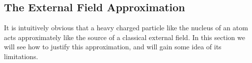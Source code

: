 
\subsection[The External Field Approximation]{The External Field Approximation\texorpdfstring{\protect\footnotemark}{}}

It is intuitively obvious that a heavy charged particle like the nucleus of
an atom acts approximately like the source of a classical external field. In
this section we will see how to justify this approximation, and will gain
some idea of its limitations.

